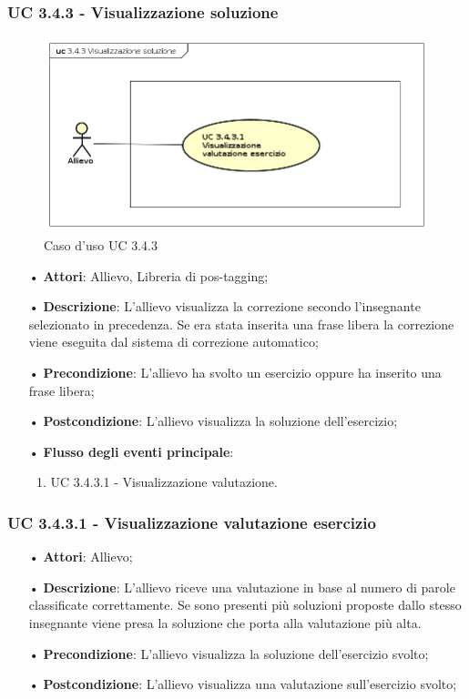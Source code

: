 \subsubsection{UC 3.4.3 - Visualizzazione soluzione}

\begin{figure}[H]
\centering
\includegraphics[width=17cm]{img/UC343.png} 
\caption{Caso d'uso UC 3.4.3}\label{fig:343}
\end{figure}

\begin{itemize}
\item[•]\textbf{Attori}: Allievo, Libreria di pos-tagging;
\item[•]\textbf{Descrizione}: L'allievo visualizza la correzione secondo l'insegnante selezionato in precedenza. Se era stata inserita una frase libera la correzione viene eseguita dal sistema di correzione automatico;
\item[•]\textbf{Precondizione}: L'allievo ha svolto un esercizio oppure ha inserito una frase libera;
\item[•]\textbf{Postcondizione}: L'allievo visualizza la soluzione dell'esercizio;
\item[•]\textbf{Flusso degli eventi principale}:
\begin{enumerate}
\item UC 3.4.3.1 - Visualizzazione valutazione.  %
\end{enumerate}
\end{itemize}

\subsubsection{UC 3.4.3.1 - Visualizzazione valutazione esercizio}  %

\begin{itemize}
\item[•]\textbf{Attori}: Allievo;
\item[•]\textbf{Descrizione}: L'allievo riceve una valutazione in base al numero di parole classificate correttamente. Se sono presenti più soluzioni proposte dallo stesso insegnante viene presa la soluzione che porta alla valutazione più alta.
\item[•]\textbf{Precondizione}: L'allievo visualizza la soluzione dell'esercizio svolto;
\item[•]\textbf{Postcondizione}: L'allievo visualizza una valutazione sull'esercizio svolto;
\end{itemize}


